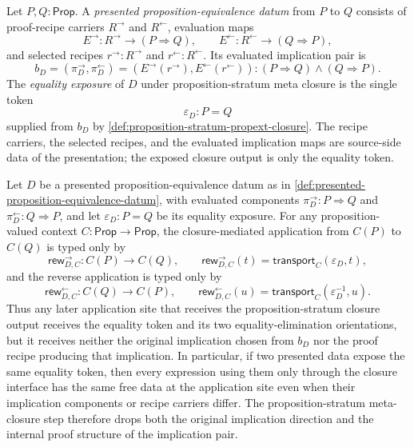 \begin{definition}
\label{def:presented-proposition-equivalence-datum}
Let $P,Q:\mathsf{Prop}$. A \emph{presented proposition-equivalence datum} from $P$ to $Q$ consists of proof-recipe carriers $R^{\rightarrow}$ and $R^{\leftarrow}$, evaluation maps
$$
E^{\rightarrow}:R^{\rightarrow}\to(P\Rightarrow Q),
\qquad
E^{\leftarrow}:R^{\leftarrow}\to(Q\Rightarrow P),
$$
and selected recipes $r^{\rightarrow}:R^{\rightarrow}$ and $r^{\leftarrow}:R^{\leftarrow}$. Its evaluated implication pair is
$$
b_D=(\pi^{\rightarrow}_D,\pi^{\leftarrow}_D)
=
(E^{\rightarrow}(r^{\rightarrow}),E^{\leftarrow}(r^{\leftarrow}))
:
(P\Rightarrow Q)\land(Q\Rightarrow P).
$$
The \emph{equality exposure} of $D$ under proposition-stratum meta closure is the single token
$$
\varepsilon_D:P=Q
$$
supplied from $b_D$ by \autoref{def:proposition-stratum-propext-closure}. The recipe carriers, the selected recipes, and the evaluated implication maps are source-side data of the presentation; the exposed closure output is only the equality token.
\end{definition}

\begin{proposition}
\label{prop:proposition-stratum-meta-closure-drops-implication-direction}
Let $D$ be a presented proposition-equivalence datum as in \autoref{def:presented-proposition-equivalence-datum}, with evaluated components $\pi^{\rightarrow}_D:P\Rightarrow Q$ and $\pi^{\leftarrow}_D:Q\Rightarrow P$, and let $\varepsilon_D:P=Q$ be its equality exposure. For any proposition-valued context $C:\mathsf{Prop}\to\mathsf{Prop}$, the closure-mediated application from $C(P)$ to $C(Q)$ is typed only by
$$
\mathsf{rew}^{\rightarrow}_{D,C}:C(P)\to C(Q),
\qquad
\mathsf{rew}^{\rightarrow}_{D,C}(t)=\mathsf{transport}_{C}(\varepsilon_D,t),
$$
and the reverse application is typed only by
$$
\mathsf{rew}^{\leftarrow}_{D,C}:C(Q)\to C(P),
\qquad
\mathsf{rew}^{\leftarrow}_{D,C}(u)=\mathsf{transport}_{C}(\varepsilon_D^{-1},u).
$$
Thus any later application site that receives the proposition-stratum closure output receives the equality token and its two equality-elimination orientations, but it receives neither the original implication chosen from $b_D$ nor the proof recipe producing that implication. In particular, if two presented data expose the same equality token, then every expression using them only through the closure interface has the same free data at the application site even when their implication components or recipe carriers differ. The proposition-stratum meta-closure step therefore drops both the original implication direction and the internal proof structure of the implication pair.
\end{proposition}

